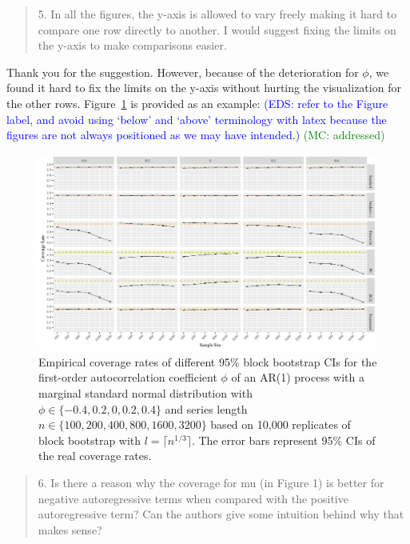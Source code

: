 \documentclass[12pt]{article}
\newcommand{\eds}[1]{\textcolor{blue}{(EDS: #1)}}
\newcommand{\mc}[1]{\textcolor{green}{(MC: #1)}}
\newenvironment{comment}%
{\begin{quotation}\noindent\small\it\color{darkblue}\ignorespaces%
}{\end{quotation}}
\begin{document}
\begin{comment}
5.  In all the figures, the y-axis is allowed to vary freely making it hard to 
compare one row directly to another.  I would suggest fixing the limits on the 
y-axis to make comparisons easier.  
\end{comment}

Thank you for the suggestion. However, because of the deterioration for $\phi$, 
we found it hard to fix the limits on 
the 
y-axis without hurting the visualization for the other rows. 
Figure~\ref{fig:alt_phi1} is provided as an 
example:  \eds{refer to the Figure label, and avoid using `below' and `above'
terminology with latex because the figures are not always positioned as we may
have intended.}
\mc{addressed}

\begin{figure}[tbp]
  \centering
  \includegraphics[width=\textwidth]{figures/alt2plot_norm_phi_1}
  \caption{Empirical coverage rates of different 95\% block bootstrap CIs for 
    the first-order autocorrelation coefficient $\phi$ of an AR(1) process with 
    a marginal standard normal distribution with 
    $\phi \in \{-0.4, 0.2, 0, 0.2, 0.4\}$ and series length
    $n \in \{100, 200, 400, 800, 1600, 3200\}$ based on 10,000 replicates of
    block bootstrap with $l = \lceil n^{1/3} \rceil$. The
    error bars represent 95\% CIs of the real coverage rates.}
  \label{fig:alt_phi1}
\end{figure}

\begin{comment}
6.  Is there a reason why the coverage for mu (in Figure 1) is better for 
negative autoregressive terms when compared with the positive autoregressive 
term? Can the authors give some intuition behind why that makes sense? 
\end{comment}
\end{document}
